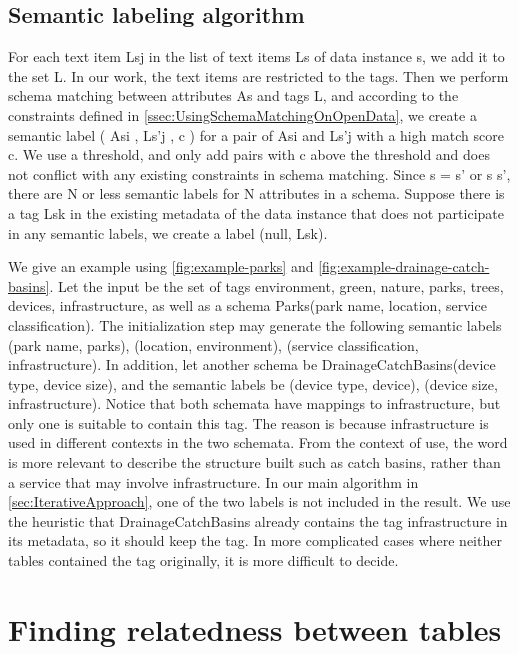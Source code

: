 \subsection{Semantic labeling algorithm}
\label{ssec:SemanticLabelingAlgorithm}

For each text item Lsj in the list of text items Ls of data instance s, we add it to the set L. In our work, the text items are restricted to the tags. Then we perform schema matching between attributes As and tags L, and according to the constraints defined in \autoref{ssec:UsingSchemaMatchingOnOpenData}, we create a semantic label ( Asi , Ls'j , c ) for a pair of Asi and Ls'j with a high match score c. We use a threshold, and only add pairs with c above the threshold and does not conflict with any existing constraints in schema matching. Since s = s' or s s', there are N or less semantic labels for N attributes in a schema.
Suppose there is a tag Lsk in the existing metadata of the data instance that does not participate in any semantic labels, we create a label (null, Lsk).

We give an example using \autoref{fig:example-parks} and \autoref{fig:example-drainage-catch-basins}. Let the input be the set of tags {environment, green, nature, parks, trees, devices, infrastructure}, as well as a schema Parks(park name, location, service classification). The initialization step may generate the following semantic labels (park name, parks), (location, environment), (service classification, infrastructure). In addition, let another schema be DrainageCatchBasins(device type, device size), and the semantic labels be (device type, device), (device size, infrastructure).
Notice that both schemata have mappings to infrastructure, but only one is suitable to contain this tag. The reason is because infrastructure is used in different contexts in the two schemata. From the context of use, the word is more relevant to describe the structure built such as catch basins, rather than a service that may involve infrastructure. In our main algorithm in \autoref{sec:IterativeApproach}, one of the two labels is not included in the result. We use the heuristic that DrainageCatchBasins already contains the tag infrastructure in its metadata, so it should keep the tag. In more complicated cases where neither tables contained the tag originally, it is more difficult to decide.

\section{Finding relatedness between tables}
\label{sec:FindingRelatednessBetweenTables}

